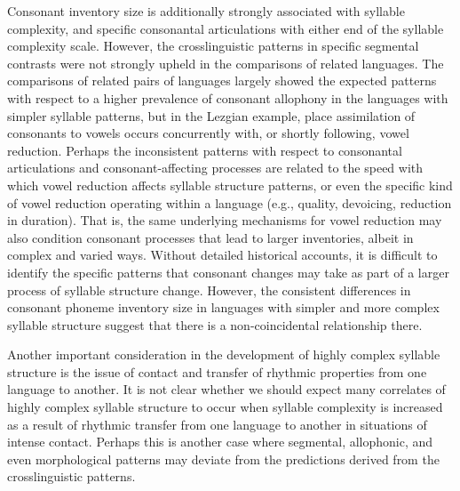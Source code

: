   Consonant inventory size is additionally strongly associated with syllable complexity, and specific consonantal articulations with either end of the syllable complexity scale. However, the crosslinguistic patterns in specific segmental contrasts were not strongly upheld in the comparisons of related languages. The comparisons of related pairs of languages largely showed the expected patterns with respect to a higher prevalence of consonant allophony in the languages with simpler syllable patterns, but in the Lezgian example, place assimilation of consonants to vowels occurs concurrently with, or shortly following, vowel reduction. Perhaps the inconsistent patterns with respect to consonantal articulations and consonant-affecting processes are related to the speed with which vowel reduction affects syllable structure patterns, or even the specific kind of vowel reduction operating within a language (e.g., quality, devoicing, reduction in duration). That is, the same underlying mechanisms for vowel reduction may also condition consonant processes that lead to larger inventories, albeit in complex and varied ways. Without detailed historical accounts, it is difficult to identify the specific patterns that consonant changes may take as part of a larger process of syllable structure change. However, the consistent differences in consonant phoneme inventory size in languages with simpler and more complex syllable structure suggest that there is a non-coincidental relationship there.



  Another important consideration in the development of highly complex syllable structure is the issue of contact and transfer of rhythmic properties from one language to another. It is not clear whether we should expect many correlates of highly complex syllable structure to occur when syllable complexity is increased as a result of rhythmic transfer from one language to another in situations of intense contact. Perhaps this is another case where segmental, allophonic, and even morphological patterns may deviate from the predictions derived from the crosslinguistic patterns.



